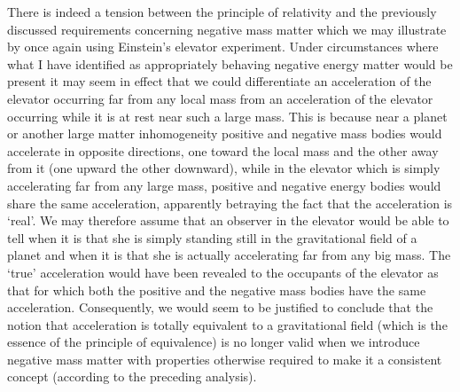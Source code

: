 \documentclass[notitlepage,12pt]{report}
\begin{document}
There is indeed a tension between the principle of relativity and the previously discussed requirements concerning negative mass matter which we may illustrate by once again using Einstein's elevator experiment. Under circumstances where what I have identified as appropriately behaving negative energy matter would be present it may seem in effect that we could differentiate an acceleration of the elevator occurring far from any local mass from an acceleration of the elevator occurring while it is at rest near such a large mass. This is because near a planet or another large matter inhomogeneity positive and negative mass bodies would accelerate in opposite directions, one toward the local mass and the other away from it (one upward the other downward), while in the elevator which is simply accelerating far from any large mass, positive and negative energy bodies would share the same acceleration, apparently betraying the fact that the acceleration is `real'. We may therefore assume that an observer in the elevator would be able to tell when it is that she is simply standing still in the gravitational field of a planet and when it is that she is actually accelerating far from any big mass. The `true' acceleration would have been revealed to the occupants of the elevator as that for which both the positive and the negative mass bodies have the same acceleration. Consequently, we would seem to be justified to conclude that the notion that acceleration is totally equivalent to a gravitational field (which is the essence of the principle of equivalence) is no longer valid when we introduce negative mass matter with properties otherwise required to make it a consistent concept (according to the preceding analysis).
\end{document}
